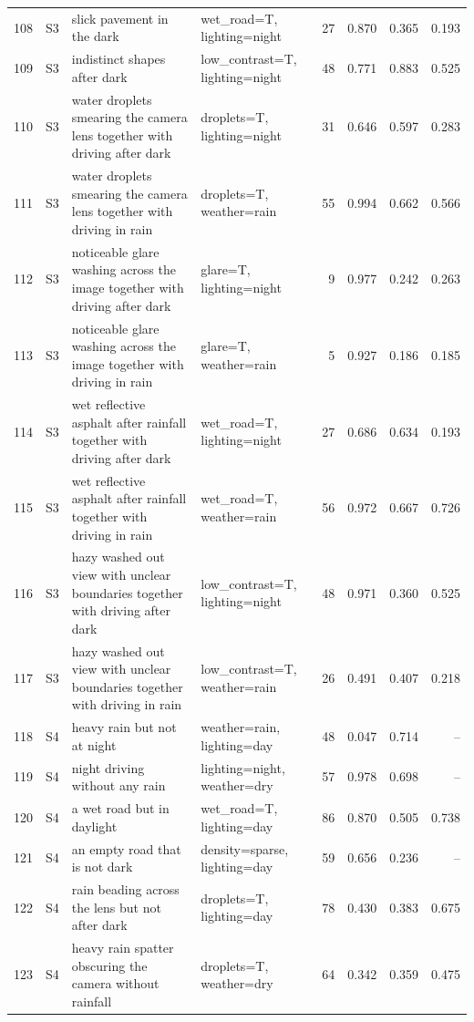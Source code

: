 \begin{longtable}{r l p{5.0cm} p{3.4cm} r r r r}
108 & S3 & slick pavement in the dark & wet\_road=T, lighting=night & 27 & 0.870 & 0.365 & 0.193\\
109 & S3 & indistinct shapes after dark & low\_contrast=T, lighting=night & 48 & 0.771 & 0.883 & 0.525\\
110 & S3 & water droplets smearing the camera lens together with driving after dark & droplets=T, lighting=night & 31 & 0.646 & 0.597 & 0.283\\
111 & S3 & water droplets smearing the camera lens together with driving in rain & droplets=T, weather=rain & 55 & 0.994 & 0.662 & 0.566\\
112 & S3 & noticeable glare washing across the image together with driving after dark & glare=T, lighting=night & 9 & 0.977 & 0.242 & 0.263\\
113 & S3 & noticeable glare washing across the image together with driving in rain & glare=T, weather=rain & 5 & 0.927 & 0.186 & 0.185\\
114 & S3 & wet reflective asphalt after rainfall together with driving after dark & wet\_road=T, lighting=night & 27 & 0.686 & 0.634 & 0.193\\
115 & S3 & wet reflective asphalt after rainfall together with driving in rain & wet\_road=T, weather=rain & 56 & 0.972 & 0.667 & 0.726\\
116 & S3 & hazy washed out view with unclear boundaries together with driving after dark & low\_contrast=T, lighting=night & 48 & 0.971 & 0.360 & 0.525\\
117 & S3 & hazy washed out view with unclear boundaries together with driving in rain & low\_contrast=T, weather=rain & 26 & 0.491 & 0.407 & 0.218\\
118 & S4 & heavy rain but not at night & weather=rain, lighting=day & 48 & 0.047 & 0.714 & --\\
119 & S4 & night driving without any rain & lighting=night, weather=dry & 57 & 0.978 & 0.698 & --\\
120 & S4 & a wet road but in daylight & wet\_road=T, lighting=day & 86 & 0.870 & 0.505 & 0.738\\
121 & S4 & an empty road that is not dark & density=sparse, lighting=day & 59 & 0.656 & 0.236 & --\\
122 & S4 & rain beading across the lens but not after dark & droplets=T, lighting=day & 78 & 0.430 & 0.383 & 0.675\\
123 & S4 & heavy rain spatter obscuring the camera without rainfall & droplets=T, weather=dry & 64 & 0.342 & 0.359 & 0.475\\

\end{longtable}
